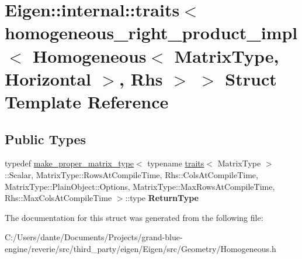\hypertarget{struct_eigen_1_1internal_1_1traits_3_01homogeneous__right__product__impl_3_01_homogeneous_3_01_mc10ae8b83e72e7ac1f6457e2d5f54a0a}{}\section{Eigen\+::internal\+::traits$<$ homogeneous\+\_\+right\+\_\+product\+\_\+impl$<$ Homogeneous$<$ Matrix\+Type, Horizontal $>$, Rhs $>$ $>$ Struct Template Reference}
\label{struct_eigen_1_1internal_1_1traits_3_01homogeneous__right__product__impl_3_01_homogeneous_3_01_mc10ae8b83e72e7ac1f6457e2d5f54a0a}
\subsection*{Public Types}
\begin{DoxyCompactItemize}
\item 
\mbox{\label{struct_eigen_1_1internal_1_1traits_3_01homogeneous__right__product__impl_3_01_homogeneous_3_01_mc10ae8b83e72e7ac1f6457e2d5f54a0a_a0ae985aecdcbfccc4e6a2b6aa60e6d7a}} 
typedef \mbox{\hyperlink{class_eigen_1_1internal_1_1make__proper__matrix__type}{make\+\_\+proper\+\_\+matrix\+\_\+type}}$<$ typename \mbox{\hyperlink{struct_eigen_1_1internal_1_1traits}{traits}}$<$ Matrix\+Type $>$\+::Scalar, Matrix\+Type\+::\+Rows\+At\+Compile\+Time, Rhs\+::\+Cols\+At\+Compile\+Time, Matrix\+Type\+::\+Plain\+Object\+::\+Options, Matrix\+Type\+::\+Max\+Rows\+At\+Compile\+Time, Rhs\+::\+Max\+Cols\+At\+Compile\+Time $>$\+::type {\bfseries Return\+Type}
\end{DoxyCompactItemize}


The documentation for this struct was generated from the following file\+:\begin{DoxyCompactItemize}
\item 
C\+:/\+Users/dante/\+Documents/\+Projects/grand-\/blue-\/engine/reverie/src/third\+\_\+party/eigen/\+Eigen/src/\+Geometry/Homogeneous.\+h\end{DoxyCompactItemize}
